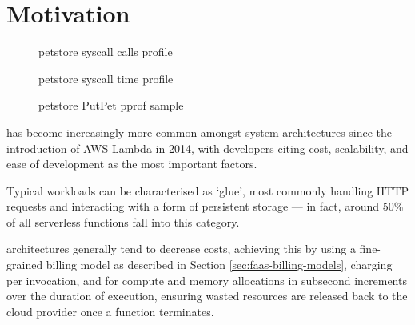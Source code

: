 \section{Motivation}
\begin{figure}
    \begin{center}
        
    \end{center}
    \caption{\faas{} petstore syscall calls profile}
\end{figure}

\begin{figure}
    \begin{center}
        
    \end{center}
    \caption{\faas{} petstore syscall time profile}
\end{figure}

\begin{figure*}
    \begin{center}
        \begin{tikzpicture}[scale = 0.75, every node/.style={scale=0.75}]
            
        \end{tikzpicture}
    \end{center}
    \caption{\faas{} petstore PutPet pprof sample}
\end{figure*}

\faaslong{} has become increasingly more common amongst system architectures since the introduction of AWS Lambda\cite{amazonAWSLambda2024} in 2014, with developers citing cost, scalability, and ease of development as the most important factors\cite{eismannReviewServerlessUse2020}.

Typical \faas{} workloads can be characterised as `glue', most commonly handling HTTP requests and interacting with a form of persistent storage --- in fact, around 50\% of all serverless functions fall into this category\cite{eismannReviewServerlessUse2020}.

\faas{} architectures generally tend to decrease costs, achieving this by using a fine-grained billing model as described in Section \ref{sec:faas-billing-models}, charging per invocation, and for compute and memory allocations in subsecond increments over the duration of execution, ensuring wasted resources are released back to the cloud provider once a function terminates.

